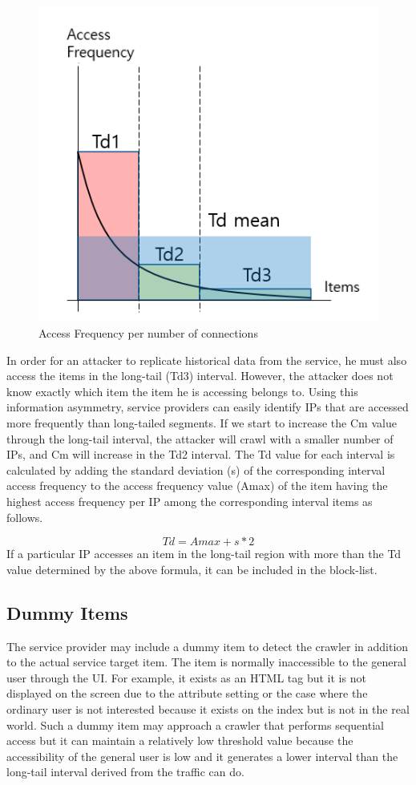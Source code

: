 \documentclass[sigconf,anonymous=false]{acmart}
\begin{document}
\begin{figure}[H]
    \includegraphics[width=0.7\columnwidth]{figs/figure_01.png}
    \caption{Access Frequency per number of connections}
    \label{fig:my_label}
\end{figure}

In order for an attacker to replicate historical data from the service, he must also access the items in the long-tail (Td3) interval. However, the attacker does not know exactly which item the item he is accessing belongs to. Using this information asymmetry, service providers can easily identify IPs that are accessed more frequently than long-tailed segments. If we start to increase the Cm value through the long-tail interval, the attacker will crawl with a smaller number of IPs, and Cm will increase in the Td2 interval.
The Td value for each interval is calculated by adding the standard deviation (s) of the corresponding interval access frequency to the access frequency value (Amax) of the item having the highest access frequency per IP among the corresponding interval items as follows. 

  \begin{displaymath}
    Td = Amax + s * 2
  \end{displaymath}\newline
If a particular IP accesses an item in the long-tail region with more than the Td value determined by the above formula, it can be included in the block-list.

\subsection{Dummy Items}
The service provider may include a dummy item to detect the crawler in addition to the actual service target item. The item is normally inaccessible to the general user through the UI. For example, it exists as an HTML tag but it is not displayed on the screen due to the attribute setting or the case where the ordinary user is not interested because it exists on the index but is not in the real world.
Such a dummy item may approach a crawler that performs sequential access but it can maintain a relatively low threshold value because the accessibility of the general user is low and it generates a lower interval than the long-tail interval derived from the traffic can do.
\end{document}
